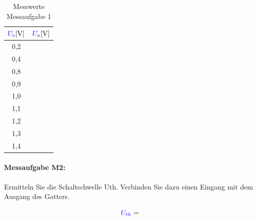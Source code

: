 \documentclass[11pt,a4paper,titlepage,parskip=half]{scrreprt}
\begin{document}
          \begin{center}
            \begin{table}[H]
              \caption{Messwerte Messaufgabe 1}
              \renewcommand{\arraystretch}{1.6}
              \begin{center}
                \begin{tabular}{c|c}
                  $\textcolor{blue}{U_e} [\si{\volt}]$ & $\textcolor{blue}{U_a} [\si{\volt}]$ \\ \hline
                   0,2& \qquad\qquad\qquad\qquad\\\hline
                   0,4& \\\hline
                   0,8& \\\hline
                   0,9& \\\hline
                   1,0& \\\hline
                   1,1& \\\hline
                   1,2& \\\hline
                   1,3& \\\hline
                   1,4&
                \end{tabular}
              \end{center}
            \end{table}
          \end{center}

        \paragraph{Messaufgabe M2:} Ermitteln Sie die Schaltschwelle Uth. Verbinden Sie dazu einen Eingang mit dem Ausgang des Gatters.

          \begin{equation*}
            \textcolor{blue}{U_{th}} =
          \end{equation*}
\end{document}
